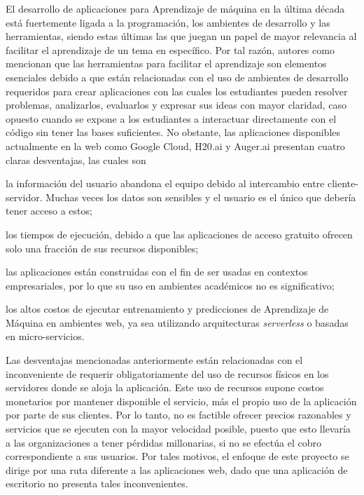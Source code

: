 El desarrollo de aplicaciones para Aprendizaje de máquina en la última década está fuertemente ligada a la programación, los ambientes de desarrollo y las herramientas, siendo estas últimas las que juegan un papel de mayor relevancia al facilitar el aprendizaje de un tema en específico. Por tal razón, autores como \textcite{Francis1983, Salleh2013} mencionan que las herramientas para facilitar el aprendizaje son elementos esenciales debido a que están relacionadas con el uso de ambientes de desarrollo requeridos para crear aplicaciones con las cuales los estudiantes pueden resolver problemas, analizarlos, evaluarlos y expresar sus ideas con mayor claridad, caso opuesto cuando se expone a los estudiantes a interactuar directamente con el código sin tener las bases suficientes. No obstante, las aplicaciones disponibles actualmente en la web como Google Cloud, H20.ai y Auger.ai presentan cuatro claras desventajas, las cuales son 
\begin{seriate}
    \item la información del usuario abandona el equipo debido al intercambio entre cliente-servidor. Muchas veces los datos son sensibles y el usuario es el único que debería tener acceso a estos;
    \item los tiempos de ejecución, debido a que las aplicaciones de acceso gratuito ofrecen solo una fracción de sus recursos disponibles;
    \item las aplicaciones están construidas con el fin de ser usadas en contextos empresariales, por lo que su uso en ambientes académicos no es significativo;
    \item los altos costos de ejecutar entrenamiento y predicciones de Aprendizaje de Máquina en ambientes web, ya sea utilizando arquitecturas \textit{serverless} o basadas en micro-servicios.
\end{seriate}

Las desventajas mencionadas anteriormente están relacionadas con el inconveniente de requerir obligatoriamente del uso de recursos físicos en los servidores donde se aloja la aplicación. Este uso de recursos supone costos monetarios por mantener disponible el servicio, más el propio uso de la aplicación por parte de sus clientes. Por lo tanto, no es factible ofrecer precios razonables y servicios que se ejecuten con la mayor velocidad posible, puesto que esto llevaría a las organizaciones a tener pérdidas millonarias, si no se efectúa el cobro correspondiente a sus usuarios. Por tales motivos, el enfoque de este proyecto se dirige por una ruta diferente a las aplicaciones web, dado que una aplicación de escritorio no presenta tales inconvenientes.



